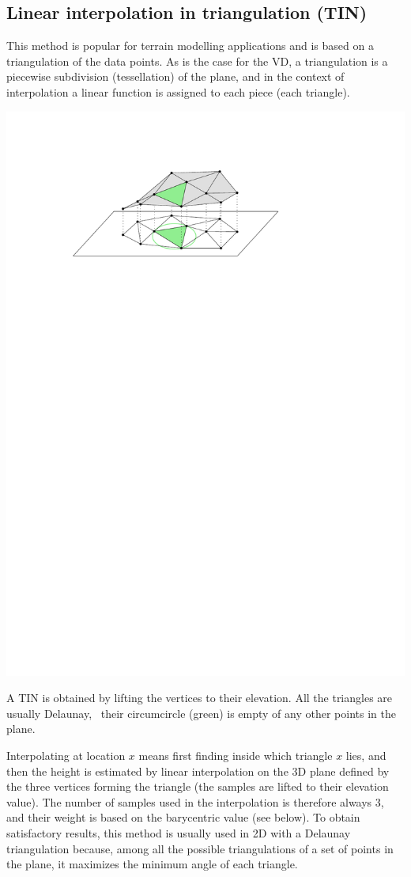 \subsection{Linear interpolation in triangulation (\textbf{TIN})}%

This method is popular for terrain modelling applications and is based on a triangulation of the data points. 
As is the case for the VD, a triangulation is a piecewise subdivision (tessellation) of the plane, and in the context of interpolation a linear function is assigned to each piece (each triangle). 
\begin{marginfigure}
  \includegraphics{../whatisterrain/figs/tin}
  \caption{A TIN is obtained by lifting the vertices to their elevation. All the triangles are usually Delaunay, \ie\ their circumcircle (green) is empty of any other points in the plane.}%
\end{marginfigure}
Interpolating at location $x$ means first finding inside which triangle $x$ lies, and then the height is estimated by linear interpolation on the 3D plane defined by the three vertices forming the triangle (the samples are lifted to their elevation value). 
The number of samples used in the interpolation is therefore always 3, and their weight is based on the barycentric value (see below).
To obtain satisfactory results, this method is usually used in 2D with a Delaunay triangulation because, among all the possible triangulations of a set of points in the plane, it maximizes the minimum angle of each triangle. 


